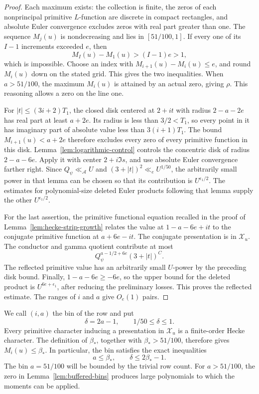 \documentclass[11pt,a4paper]{article}
\numberwithin{equation}{section}
\numberwithin{figure}{section}
\theoremstyle{definition}
\theoremstyle{remark}
\begin{document}
\begin{proof}
Each maximum exists: the collection is finite, the zeros of each
nonprincipal primitive \(L\)-function are discrete in compact
rectangles, and absolute Euler convergence excludes zeros with real
part greater than one.  The sequence \(M_j(u)\) is nondecreasing
and lies in \([51/100,1]\).  If every one of its \(I-1\) increments
exceeded \(e\), then
\[
 M_I(u)-M_1(u)>(I-1)e>1,
\]
which is impossible.  Choose an index with
\(M_{i+1}(u)-M_i(u)\le e\), and round \(M_i(u)\) down on the stated
grid.  This gives the two inequalities.  When \(a>51/100\), the
maximum \(M_i(u)\) is attained by an actual zero, giving \(\rho\).
This reasoning allows a zero on the line one.

For \(|t|\le(3i+2)T_1\), the closed disk centered at \(2+it\)
with radius \(2-a-2e\) has real part at least \(a+2e\).
Its radius is less than \(3/2<T_1\), so every point in it has
imaginary part of absolute value less than \(3(i+1)T_1\).
The bound \(M_{i+1}(u)<a+2e\) therefore excludes every zero of every
primitive function in this disk.  Lemma~\ref{lem:logarithmic-control}
controls the concentric disk of radius \(2-a-6e\).  Apply it with
center \(2+i\Im s\), and use absolute Euler convergence farther
right.  Since \(Q_\psi\ll_{\mathcal A}U\) and
\((3+|t|)^2\ll_e U^{1/50}\), the arbitrarily small power in that
lemma can be chosen so that its contribution is \(U^{\epsilon_1/2}\).
The estimates for polynomial-size deleted Euler products following
that lemma supply the other \(U^{\epsilon_1/2}\).

For the last assertion, the primitive functional equation recalled
in the proof of Lemma~\ref{lem:hecke-strip-growth}
\cite[Equation (1.1)]{GZ} relates the value at \(1-a-6e+it\) to
the conjugate primitive function at \(a+6e-it\).  The conjugate
presentation is in \(\mathcal X_u\).  The conductor and gamma
quotient contribute at most
\[
 Q_\psi^{a-1/2+6e}(3+|t|)^C.
\]
The reflected primitive value has an arbitrarily small \(U\)-power
by the preceding disk bound.  Finally, \(1-a-6e\ge-6e\), so the
upper bound for the deleted product is \(U^{6e+\epsilon_1}\), after
reducing the preliminary losses.  This proves the reflected
estimate.  The ranges of \(i\) and \(a\) give \(O_e(1)\) pairs.
\end{proof}

We call \((i,a)\) the bin of the row and put
\[
 \delta=2a-1,\qquad 1/50\le\delta\le1.
\]
Every primitive character inducing a presentation in \(\mathcal X_u\)
is a finite-order Hecke character.  The definition of \(\beta_*\),
together with \(\beta_*>51/100\), therefore gives \(M_i(u)\le\beta_*\).
In particular, the bin satisfies the exact inequalities
\[
 a\le\beta_*,\qquad \delta\le2\beta_*-1.
\]
The bin \(a=51/100\) will be bounded by the trivial row count.
For \(a>51/100\), the zero in Lemma~\ref{lem:buffered-bins} produces
large polynomials to which the moments can be applied.
\end{document}
